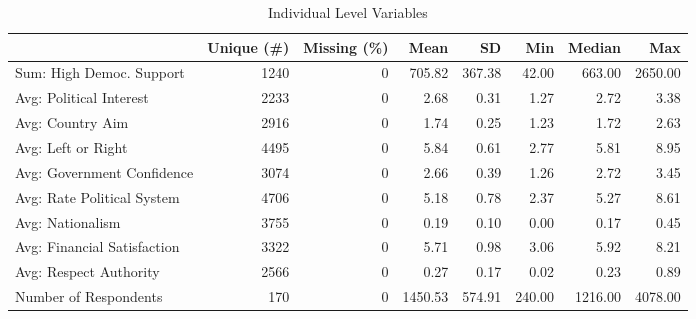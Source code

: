 \begin{table}

\caption{Individual Level Variables}
\centering
\begin{tabular}[t]{lrrrrrrr}
\toprule
  & Unique (\#) & Missing (\%) & Mean & SD & Min & Median & Max\\
\midrule
Sum: High Democ. Support & 1240 & 0 & 705.82 & 367.38 & 42.00 & 663.00 & 2650.00\\
Avg: Political Interest & 2233 & 0 & 2.68 & 0.31 & 1.27 & 2.72 & 3.38\\
Avg: Country Aim & 2916 & 0 & 1.74 & 0.25 & 1.23 & 1.72 & 2.63\\
Avg: Left or Right & 4495 & 0 & 5.84 & 0.61 & 2.77 & 5.81 & 8.95\\
Avg: Government Confidence & 3074 & 0 & 2.66 & 0.39 & 1.26 & 2.72 & 3.45\\
Avg: Rate Political System & 4706 & 0 & 5.18 & 0.78 & 2.37 & 5.27 & 8.61\\
Avg: Nationalism & 3755 & 0 & 0.19 & 0.10 & 0.00 & 0.17 & 0.45\\
Avg: Financial Satisfaction & 3322 & 0 & 5.71 & 0.98 & 3.06 & 5.92 & 8.21\\
Avg: Respect Authority & 2566 & 0 & 0.27 & 0.17 & 0.02 & 0.23 & 0.89\\
Number of Respondents & 170 & 0 & 1450.53 & 574.91 & 240.00 & 1216.00 & 4078.00\\
\bottomrule
\end{tabular}
\end{table}
